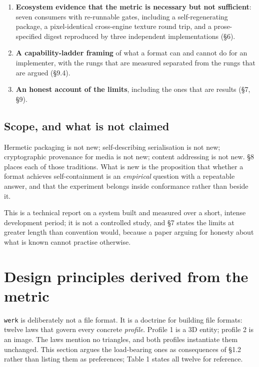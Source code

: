 \documentclass[10pt,twocolumn,letterpaper]{article}
\newcommand{\code}[1]{\texttt{\small #1}}
\begin{document}
\begin{enumerate}[leftmargin=1.2em,itemsep=1pt,topsep=2pt]
\item \textbf{Ecosystem evidence that the metric is necessary but not sufficient}: seven consumers with re-runnable gates, including a self-regenerating package, a pixel-identical cross-engine texture round trip, and a prose-specified digest reproduced by three independent implementations (\S6).
\item \textbf{A capability-ladder framing} of what a format can and cannot do for an implementer, with the rungs that are measured separated from the rungs that are argued (\S9.4).
\item \textbf{An honest account of the limits}, including the ones that are results (\S7, \S9).
\end{enumerate}

\subsection{Scope, and what is not claimed}

Hermetic packaging is not new; self-describing serialisation is not new; cryptographic provenance for media is not new; content addressing is not new. \S8 places each of those traditions. What is new is the proposition that whether a format achieves self-containment is an \emph{empirical} question with a repeatable answer, and that the experiment belongs inside conformance rather than beside it.

This is a technical report on a system built and measured over a short, intense development period; it is not a controlled study, and \S7 states the limits at greater length than convention would, because a paper arguing for honesty about what is known cannot practise otherwise.

\section{Design principles derived from the metric}

\code{werk} is deliberately not a file format. It is a doctrine for building file formats: twelve laws that govern every concrete \emph{profile}. Profile 1 is a 3D entity; profile 2 is an image. The laws mention no triangles, and both profiles instantiate them unchanged. This section argues the load-bearing ones as consequences of \S1.2 rather than listing them as preferences; Table 1 states all twelve for reference.
\end{document}
